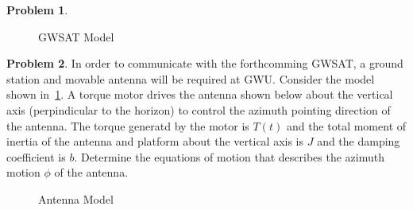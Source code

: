 \documentclass[10pt]{article}
\theoremstyle{definition}
\newtheorem{prob}{Problem}[section]
\begin{document}
\begin{prob}
\begin{figure}[h]
\begin{scaletikzpicturetowidth}{0.5\textwidth}
        \end{scaletikzpicturetowidth}
        \caption{GWSAT Model}
    \end{figure}
\end{prob}

\begin{prob}
    In order to communicate with the forthcomming GWSAT, a ground station and movable antenna will be required at GWU.
    Consider the model shown in~\cref{fig:antenna}.
    A torque motor drives the antenna shown below about the vertical axis (perpindicular to the horizon) to control the azimuth pointing direction of the antenna.
    The torque generatd by the motor is \( T(t) \) and the total moment of inertia of the antenna and platform about the vertical axis is \( J \) and the damping coefficient is \( b\).
    Determine the equations of motion that describes the azimuth motion \( \phi\) of the antenna.

    \begin{figure}[h]
        \centering
        \begin{scaletikzpicturetowidth}{0.25\textwidth}

        \end{scaletikzpicturetowidth}
        \caption{Antenna Model~\label{fig:antenna}}
    \end{figure}
\end{prob}
\end{document}
